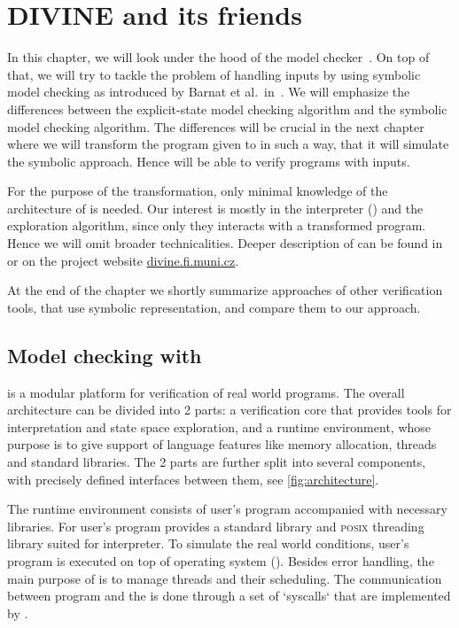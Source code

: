 \chapter{DIVINE and its friends}\label{ch:divine}

In this chapter, we will look under the hood of the \DIVINE model
checker~\cite{Divine17}.  On top of that, we will try to tackle the problem of
handling inputs by using symbolic model checking as introduced by Barnat et
al.~in~\cite{Barnat14}. We will emphasize the differences between the
explicit-state model checking algorithm and the symbolic model checking algorithm.
The differences will be crucial in the next chapter where we will transform the
program given to \DIVINE in such a way, that it will simulate the symbolic approach.
Hence \DIVINE will be able to verify programs with inputs.

For the purpose of the transformation, only minimal knowledge of the architecture of
\DIVINE is needed. Our interest is mostly in the \LLVM interpreter (\DIVM) and
the exploration algorithm, since only they interacts with a transformed program.
Hence we will omit broader technicalities.  Deeper description of \DIVINE can be
found in \cite{Divine17} or on the project website
\href{https://divine.fi.muni.cz/}{divine.fi.muni.cz}.

At the end of the chapter we shortly summarize approaches of other verification
tools, that use symbolic representation, and compare them to our approach.

\section{Model checking with \DIVINE}


\DIVINE is a modular platform for verification of real world programs.  The
overall architecture can be divided into 2 parts: a verification core that
provides tools for \LLVM interpretation and state space exploration, and a
runtime environment, whose purpose is to give support of language features like
memory allocation, threads and standard libraries. The 2 parts are further split
into several components, with precisely defined interfaces between them, see
\autoref{fig:architecture}.

The runtime environment consists of user's program accompanied with necessary
libraries. For user's program \DIVINE provides a \Cpp{} standard library and
\textsc{posix} threading library suited for \DIVINE interpreter. To simulate the
real world conditions, user's program is executed on top of \DIVINE
operating system (\DIOS). Besides error handling, the main purpose of \DIOS is
to manage threads and their scheduling. The communication between program and
the \DIOS is done through a set of `syscalls` that are implemented by \DIOS.


